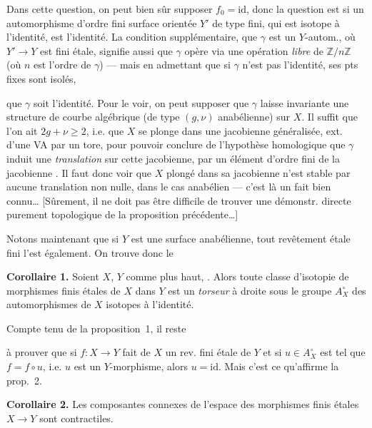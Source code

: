 \documentclass[11pt,a4paper]{article}
\begin{document}
Dans cette question, on peut bien sûr supposer $f_{0}=\mathrm{id}$, donc la question est si un automorphisme \add{$\gamma$} d'ordre fini   surface orientée $Y'$ de type fini, qui est isotope à l'identité, est l'identité. La condition supplémentaire, que $\gamma$ est un $Y$-autom., où $Y'\to Y$ est fini étale, signifie aussi que $\gamma$ opère via une opération \emph{libre} de $\mathbb{Z}/n\mathbb{Z}$ (où $n$ est l'ordre de $\gamma$) — mais en admettant que si $\gamma$  n'est pas l'identité, ses pts fixes sont isolés,


que $\gamma$ soit l'identité. Pour le voir, on peut supposer que $\gamma$ laisse invariante une structure de courbe algébrique (de type $(g,\nu)$ anabélienne) sur $X$. Il suffit que l'on ait $2g+\nu\geq 2$, i.e. que $X$ se plonge dans une jacobienne généralisée, ext. d'une VA par un tore, pour pouvoir conclure de l'hypothèse homologique que $\gamma$ induit une \emph{translation} sur cette jacobienne, par un élément d'ordre fini de la jacobienne . Il faut donc voir que $X$ plongé dans sa jacobienne n'est stable par aucune \struck{\ill{}} translation non nulle, dans le cas anabélien — c'est là un fait bien connu… [Sûrement, il ne doit pas être difficile de trouver une démonstr. directe purement topologique de la proposition précédente…]

Notons maintenant que si $Y$ est une surface  anabélienne, tout revêtement étale fini l'est également. On trouve donc le

\textbf{Corollaire 1.}  Soient $X$, $Y$  comme plus haut, . Alors toute classe d'isotopie de morphismes finis étales de $X$ dans $Y$ est un \emph{torseur} à droite sous le groupe $A^{\circ}_{X}$ des automorphismes de $X$ isotopes à l'identité.

Compte tenu de la proposition~1, il reste

à prouver que si $f\colon X\to Y$ fait de $X$ un rev. fini étale de $Y$ et si $u\in A^{\circ}_{X}$ est tel que $f=f\circ u$, i.e. $u$ est un $Y$-morphisme, alors $u=\mathrm{id}$. Mais c'est ce qu'affirme la prop.~2.

\textbf{Corollaire 2.} Les composantes connexes de l'espace des morphismes finis étales $X\to Y$ sont contractiles.
\end{document}

